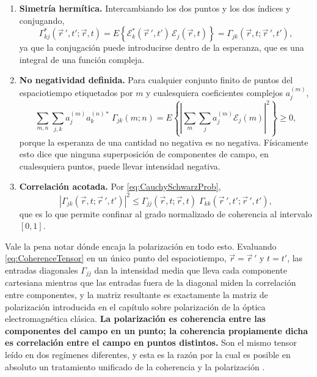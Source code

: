		\begin{enumerate}
			\item \textbf{Simetría hermítica.} Intercambiando los dos puntos y los dos índices y conjugando,
			\begin{equation}\label{eq:GammaHermitian}
				\Gamma_{kj}^{*}(\vec{r}\,',t';\vec{r},t) = E\left\{\mathcal{E}_{k}^{*}(\vec{r}\,',t')\,\mathcal{E}_{j}(\vec{r},t)\right\} = \Gamma_{jk}(\vec{r},t;\vec{r}\,',t'),
			\end{equation}
			ya que la conjugación puede introducirse dentro de la esperanza, que es una integral de una función compleja.
			\item \textbf{No negatividad definida.} Para cualquier conjunto finito de puntos del espaciotiempo etiquetados por $m$ y cualesquiera coeficientes complejos $a_{j}^{(m)}$,
			\begin{equation}\label{eq:GammaPositive}
				\sum_{m,n}\sum_{j,k}a_{j}^{(m)}a_{k}^{(n)*}\,\Gamma_{jk}(m;n)
				= E\left\{\left|\sum_{m}\sum_{j}a_{j}^{(m)}\mathcal{E}_{j}(m)\right|^{2}\right\}\geq 0,
			\end{equation}
			porque la esperanza de una cantidad no negativa es no negativa. Físicamente esto dice que ninguna superposición de componentes de campo, en cualesquiera puntos, puede llevar intensidad negativa.
			\item \textbf{Correlación acotada.} Por \eqref{eq:CauchySchwarzProb},
			\begin{equation}\label{eq:GammaBound}
				\left|\Gamma_{jk}(\vec{r},t;\vec{r}\,',t')\right|^{2} \leq \Gamma_{jj}(\vec{r},t;\vec{r},t)\;\Gamma_{kk}(\vec{r}\,',t';\vec{r}\,',t'),
			\end{equation}
			que es lo que permite confinar al grado normalizado de coherencia al intervalo $[0,1]$.
		\end{enumerate}

		Vale la pena notar dónde encaja la polarización en todo esto. Evaluando \eqref{eq:CoherenceTensor} en un único punto del espaciotiempo, $\vec{r}=\vec{r}\,'$ y $t=t'$, las entradas diagonales $\Gamma_{jj}$ dan la intensidad media que lleva cada componente cartesiana mientras que las entradas fuera de la diagonal miden la correlación entre componentes, y la matriz resultante es exactamente la matriz de polarización introducida en el capítulo sobre polarización de la óptica electromagnética clásica. \textbf{La polarización es coherencia entre las componentes del campo en un punto; la coherencia propiamente dicha es correlación entre el campo en puntos distintos.} Son el mismo tensor leído en dos regímenes diferentes, y esta es la razón por la cual es posible en absoluto un tratamiento unificado de la coherencia y la polarización \citep{wolf2007introduction}.

